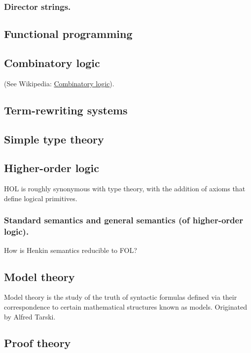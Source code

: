 \subsubsection{Director strings.}

\subsection{Functional programming}

\subsection{Combinatory logic}

(See Wikipedia: \href{http://en.wikipedia.org/wiki/Combinatory_logic}{Combinatory logic}).

\subsection{Term-rewriting systems}

\subsection{Simple type theory}

\subsection{Higher-order logic}

HOL is roughly synonymous with type theory, with the addition of axioms that define logical primitives.

\subsubsection{Standard semantics and general semantics (of higher-order logic).}

How is Henkin semantics reducible to FOL?

\subsection{Model theory}

Model theory is the study of the truth of syntactic formulas defined via their correspondence to certain mathematical structures known as models.  Originated by Alfred Tarski.

\subsection{Proof theory}

